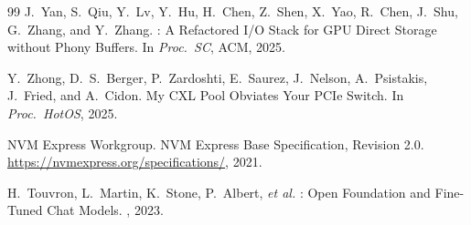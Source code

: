 \documentclass{article}
\begin{document}
\begin{thebibliography}{99}
J.~Yan, S.~Qiu, Y.~Lv, Y.~Hu, H.~Chen, Z.~Shen, X.~Yao, R.~Chen,
J.~Shu, G.~Zhang, and Y.~Zhang.
: A Refactored {I/O} Stack for {GPU} Direct Storage without
  Phony Buffers.
\newblock In {\em Proc.\ SC}, ACM, 2025.

Y.~Zhong, D.~S.~Berger, P.~Zardoshti, E.~Saurez, J.~Nelson, A.~Psistakis,
J.~Fried, and A.~Cidon.
\newblock My {CXL} Pool Obviates Your {PCIe} Switch.
\newblock In {\em Proc.\ HotOS}, 2025.

{NVM Express Workgroup}.
\newblock NVM Express Base Specification, Revision 2.0.
\newblock \url{https://nvmexpress.org/specifications/}, 2021.

H.~Touvron, L.~Martin, K.~Stone, P.~Albert, \emph{et al.}
: Open Foundation and Fine-Tuned Chat Models.
, 2023.

\end{thebibliography}
\end{document}
